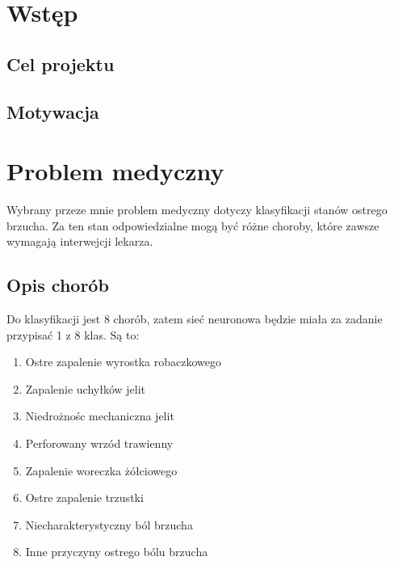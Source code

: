 


\maketitle
\tableofcontents

\pagebreak

\chapter{Wstęp}

\section{Cel projektu}

\section{Motywacja}

\chapter{Problem medyczny}

Wybrany przeze mnie problem medyczny dotyczy klasyfikacji stanów ostrego brzucha.
Za ten stan odpowiedzialne mogą być różne choroby, które zawsze wymagają interwejcji lekarza.

\section{Opis chorób}

Do klasyfikacji jest 8 chorób, zatem sieć neuronowa będzie miała za zadanie przypisać 1 z 8 klas.
Są to:
\begin{enumerate}
\item Ostre zapalenie wyrostka robaczkowego
\item Zapalenie uchyłków jelit
\item Niedrożnośc mechaniczna jelit
\item Perforowany wrzód trawienny
\item Zapalenie woreczka żółciowego
\item Ostre zapalenie trzustki
\item Niecharakterystyczny ból brzucha
\item Inne przyczyny ostrego bólu brzucha
\end{enumerate}

